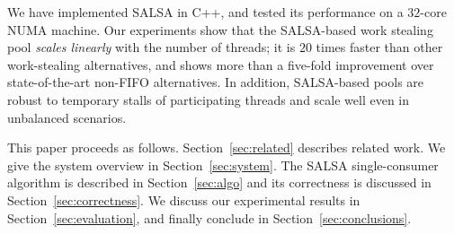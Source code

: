 We have implemented SALSA in C++, and tested its performance on a $32$-core NUMA machine. Our experiments show that the SALSA-based work stealing pool \emph{scales linearly} with the number of threads; it is $20$ times faster than other work-stealing alternatives, and shows more than a five-fold improvement over state-of-the-art non-FIFO alternatives. In addition, SALSA-based pools are robust to temporary stalls of participating threads and scale well even in unbalanced scenarios. 

This paper proceeds as follows. Section~\ref{sec:related} describes related work. We give the system overview in Section~\ref{sec:system}. The SALSA single-consumer algorithm is described in Section~\ref{sec:algo} and its correctness is discussed in Section~\ref{sec:correctness}. We discuss our experimental results in Section~\ref{sec:evaluation}, and finally conclude in Section~\ref{sec:conclusions}.